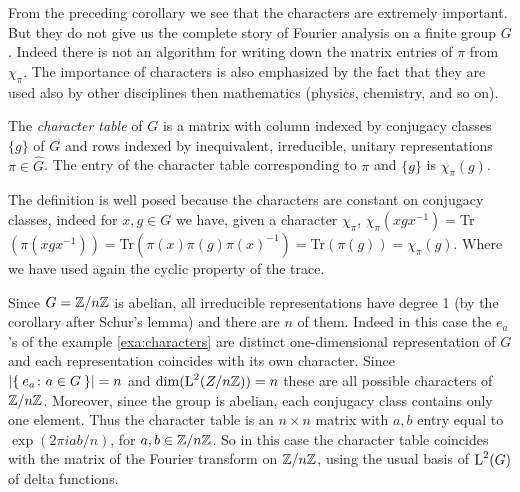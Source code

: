 From the preceding corollary we see that the characters are extremely important. But they do not give us the complete  story  of Fourier  analysis on a finite
group $G$. Indeed there is not an algorithm for writing down the matrix entries  of $\pi$ from $\chi_\pi$.
The importance of characters is also emphasized by the fact that they are used also by other disciplines then mathematics (physics, chemistry, and so on).

\begin{defn}
The \emph{character table} of $G$ is a matrix with column indexed by conjugacy classes $\{g\}$ of $G$ and rows indexed by inequivalent, irreducible, unitary representations $\pi \in \hat{G}$. The entry of   the character table corresponding to $\pi$ and $\{g\}$ is $\chi_\pi(g)$.
\end{defn}
\begin{rem}
The definition is well posed because the characters are constant on conjugacy classes, indeed for $x,g\in G$ we have, given a character $\chi_\pi$, $\chi_\pi(xgx^{-1})=$Tr$(\pi(xgx^{-1}))=$Tr$(\pi(x)\pi(g)\pi(x)^{-1})=$Tr$(\pi(g))=\chi_\pi(g)$.
Where we have used again the cyclic property of the trace.
\end{rem}
\begin{exmp}[$\Z/{n\Z}$]
Since $G={\mathbb Z}/{n{\mathbb Z}}$ is abelian, all irreducible representations  have  degree  1 (by the corollary after Schur's lemma)  and  there  are $n$ of them. Indeed in this case  the $e_a$'s of the example \ref{exa:characters}  are  distinct one-dimensional representation of $G$ and each representation coincides with its own character. Since $\lvert\Set{e_a\colon a \in G}\rvert= n $ and $\dim(\operatorname{L}^{2}(Z/{n{\mathbb Z}}))=n$ these are all possible characters of $\Z/{n\Z}$. Moreover, since the group is abelian, each conjugacy class contains only one element. Thus the character table is an $n\times n$ matrix with $a,b$ entry equal to  $\exp(2\pi iab/n)$, for $a,b \in {\mathbb Z}/{n{\mathbb Z}}$. So in this case the character table coincides with the matrix of the Fourier transform on  $\Z/{n\Z}$, using the usual basis of $\operatorname{L}^{2}(G)$ of delta functions.	
\end{exmp}

